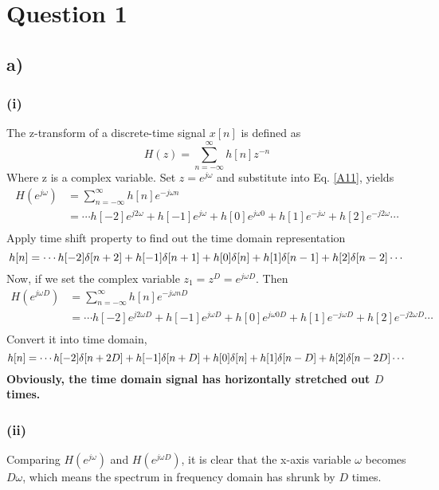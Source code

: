 \documentclass{article}
\newenvironment{homeworkProblem}[1]{
	\section*{#1}
	}{
}
\newenvironment{homeworkSection}[1]{
	\subsection*{#1}
	}{
}
\begin{document}
\newpage


\begin{homeworkProblem}{Question 1}

\begin{homeworkSection}{a)}

\subsubsection*{(i)}
The z-transform of a discrete-time signal $x[n]$ is defined as 
\begin{equation}\label{A11}
H(z)=\sum_{n=-\infty}^{\infty}h[n]z^{-n}
\end{equation}
Where z is a complex variable. Set $z=e^{j\omega}$ and substitute into Eq. \ref{A11}, yields
\begin{align*}
H(e^{j\omega})&=\sum_{n=-\infty}^{\infty}h[n]e^{-j\omega n}\\
&=\cdots h[-2]e^{j2\omega}+h[-1]e^{j\omega}+h[0]e^{j\omega 0}+h[1]e^{-j\omega}+h[2]e^{-j2\omega}\cdots\\
\end{align*}
Apply time shift property to find out the time domain representation 
\begin{equation*}
h[n]=\cdots h[-2]\delta[n+2]+h[-1]\delta[n+1]+h[0]\delta[n]+h[1]\delta[n-1]+ h[2]\delta[n-2]\cdots\\
\end{equation*}
Now, if we set the complex variable $z_1=z^D=e^{j\omega D}$. Then 
\begin{align*}
H(e^{j\omega D})&=\sum_{n=-\infty}^{\infty}h[n]e^{-j\omega nD}\\
&=\cdots h[-2]e^{j2\omega D}+h[-1]e^{j\omega D}+h[0]e^{j\omega 0 D}+h[1]e^{-j\omega D}+h[2]e^{-j2\omega D}\cdots\\
\end{align*}
Convert it into time domain,
\begin{equation*}
h[n]=\cdots h[-2]\delta[n+2D]+h[-1]\delta[n+D]+h[0]\delta[n]+h[1]\delta[n-D]+h[2]\delta[n-2D]\cdots\\
\end{equation*}
\textbf{Obviously, the time domain signal has horizontally stretched out $D$ times.}

\subsubsection*{(ii)}
Comparing $H(e^{j\omega})$ and $H(e^{j\omega D})$, it is clear that the x-axis variable $\omega$ becomes $D\omega$, which means the spectrum in frequency domain has shrunk by $D$ times.


\end{homeworkSection}
\end{homeworkProblem}
\end{document}
